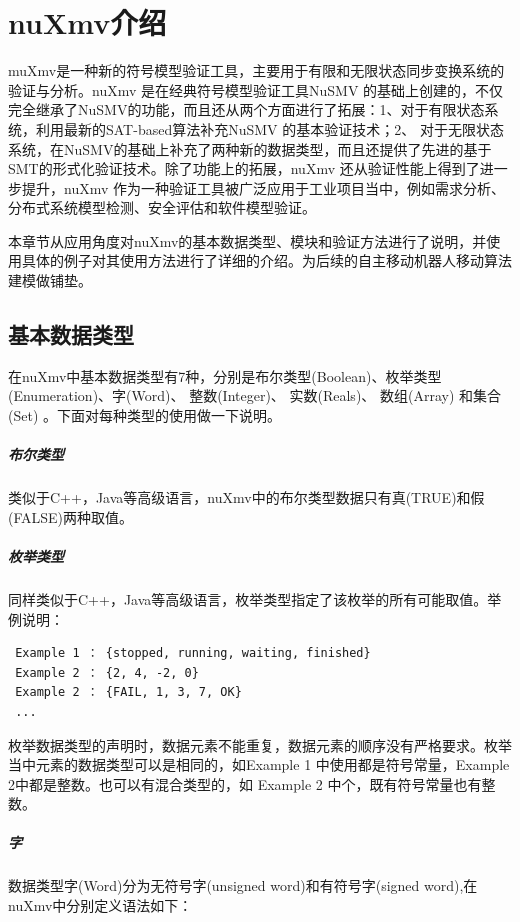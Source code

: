\chapter{nuXmv介绍}
muXmv是一种新的符号模型验证工具，主要用于有限和无限状态同步变换系统的验证与分析。nuXmv 是在经典符号模型验证工具NuSMV 的基础上创建的，不仅完全继承了NuSMV的功能，而且还从两个方面进行了拓展：1、对于有限状态系统，利用最新的SAT-based算法补充NuSMV 的基本验证技术；2、 对于无限状态系统，在NuSMV的基础上补充了两种新的数据类型，而且还提供了先进的基于SMT的形式化验证技术。除了功能上的拓展，nuXmv 还从验证性能上得到了进一步提升，nuXmv 作为一种验证工具被广泛应用于工业项目当中，例如需求分析、分布式系统模型检测、安全评估和软件模型验证。

本章节从应用角度对nuXmv的基本数据类型、模块和验证方法进行了说明，并使用具体的例子对其使用方法进行了详细的介绍。为后续的自主移动机器人移动算法建模做铺垫。

\section{基本数据类型}
在nuXmv中基本数据类型有7种，分别是布尔类型(Boolean)、枚举类型(Enumeration)、字(Word)、 整数(Integer)、 实数(Reals)、 数组(Array) 和集合(Set) 。下面对每种类型的使用做一下说明。

\paragraph{布尔类型}
类似于C++，Java等高级语言，nuXmv中的布尔类型数据只有真(TRUE)和假(FALSE)两种取值。

\paragraph{枚举类型}
同样类似于C++，Java等高级语言，枚举类型指定了该枚举的所有可能取值。举例说明：

\begin{lstlisting}
 Example 1 ： {stopped, running, waiting, finished}
 Example 2 ： {2, 4, -2, 0}
 Example 2 ： {FAIL, 1, 3, 7, OK}
 ...
\end{lstlisting}

枚举数据类型的声明时，数据元素不能重复，数据元素的顺序没有严格要求。枚举当中元素的数据类型可以是相同的，如Example 1 中使用都是符号常量，Example 2中都是整数。也可以有混合类型的，如 Example 2 中个，既有符号常量也有整数。

\paragraph{字}
数据类型字(Word)分为无符号字(unsigned word)和有符号字(signed word),在nuXmv中分别定义语法如下：


